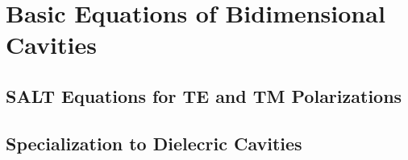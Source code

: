 \chapter{Basic Equations of Bidimensional Cavities}\label{app:basicEquations}

\section{SALT Equations for TE and TM Polarizations}

\section{Specialization to Dielecric Cavities}